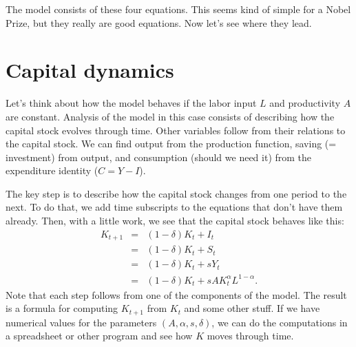The model consists of these four equations.
This seems kind of simple for a Nobel Prize, but they really are good equations.
Now let's see where they lead.


\section{Capital dynamics}
%
Let's think about how the model behaves if the labor input $L$
and productivity $A$ are constant.
Analysis of the model in this case consists of describing
how the capital stock evolves through time.
Other variables follow from their relations to the capital stock.
We can find output from the production function,
saving (= investment) from output,
and consumption (should we need it) from the expenditure identity ($ C = Y - I$).

The key step is to describe how the capital stock changes from one period to the next.
To do that, we add time subscripts to the equations that don't have them already.
Then, with a little work, we see that the capital stock behaves like this:
\begin{eqnarray}
    K_{t+1} &=& (1-\delta) K_t + I_t \nonumber \\
            &=& (1-\delta) K_t + S_t \nonumber  \\
            &=& (1-\delta) K_t + s Y_t \nonumber \\
            &=& (1-\delta) K_t + s A K_t^\alpha L^{1-\alpha} .
            \label{eq:k-lom}
\end{eqnarray}
Note that each step follows from one of the components of the model.
The result is a formula for computing $K_{t+1}$ from $K_t$ and some other stuff.
If we have numerical values for the parameters $(A,\alpha,s,\delta)$,
we can do the computations in a spreadsheet or other program
and see how $K$ moves through time.


